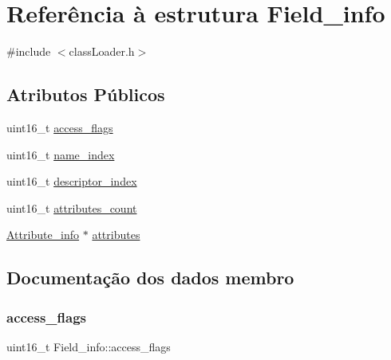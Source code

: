 \hypertarget{struct_field__info}{}\section{Referência à estrutura Field\+\_\+info}
\label{struct_field__info}


{\ttfamily \#include $<$class\+Loader.\+h$>$}

\subsection*{Atributos Públicos}
\begin{DoxyCompactItemize}
\item 
uint16\+\_\+t \hyperlink{struct_field__info_aae40229e3067e9493535c259319e5782}{access\+\_\+flags}
\item 
uint16\+\_\+t \hyperlink{struct_field__info_ab06ae42bbb051661509e6935932e3e6c}{name\+\_\+index}
\item 
uint16\+\_\+t \hyperlink{struct_field__info_af108293f133b1cd3a98285694d1299dd}{descriptor\+\_\+index}
\item 
uint16\+\_\+t \hyperlink{struct_field__info_aba9e2147bd09cbcb686b223f1737a2e4}{attributes\+\_\+count}
\item 
\hyperlink{struct_attribute__info}{Attribute\+\_\+info} $\ast$ \hyperlink{struct_field__info_a82d5d1b1ba57dfc6b711072777d92894}{attributes}
\end{DoxyCompactItemize}


\subsection{Documentação dos dados membro}
\hypertarget{struct_field__info_aae40229e3067e9493535c259319e5782}{}\label{struct_field__info_aae40229e3067e9493535c259319e5782} 
\subsubsection{\texorpdfstring{access\+\_\+flags}{access\_flags}}
{\footnotesize\ttfamily uint16\+\_\+t Field\+\_\+info\+::access\+\_\+flags}

\hypertarget{struct_field__info_a82d5d1b1ba57dfc6b711072777d92894}{}\label{struct_field__info_a82d5d1b1ba57dfc6b711072777d92894} 
